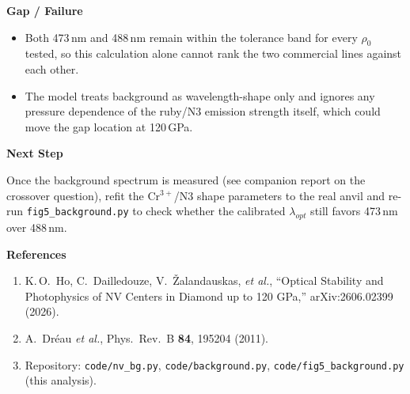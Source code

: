 \documentclass[11pt,a4paper]{ltjsarticle}
\newcommand{\sectionblock}[1]{%
  \vspace{2mm}
  {\large\textbf{#1}}
  \vspace{1mm}

}
\begin{document}
\sectionblock{Gap / Failure}

\begin{itemize}[leftmargin=8mm]
  \item Both 473\,nm and 488\,nm remain within the tolerance band for every $\rho_0$ tested, so this calculation alone cannot rank the two commercial lines against each other.
  \item The model treats background as wavelength-shape only and ignores any pressure dependence of the ruby/N3 emission strength itself, which could move the gap location at 120\,GPa.
\end{itemize}

\sectionblock{Next Step}

Once the background spectrum is measured (see companion report on the crossover question), refit the Cr$^{3+}$/N3 shape parameters to the real anvil and re-run \texttt{fig5\_background.py} to check whether the calibrated $\lambda_{opt}$ still favors 473\,nm over 488\,nm.

\sectionblock{References}

\begin{enumerate}[leftmargin=8mm]
  \item K.\,O.\ Ho, C.\ Dailledouze, V.\ \v{Z}alandauskas, \emph{et al.}, ``Optical Stability and Photophysics of NV Centers in Diamond up to 120 GPa,'' arXiv:2606.02399 (2026).
  \item A.\ Dr\'eau \emph{et al.}, Phys.\ Rev.\ B \textbf{84}, 195204 (2011).
  \item Repository: \texttt{code/nv\_bg.py}, \texttt{code/background.py}, \texttt{code/fig5\_background.py} (this analysis).
\end{enumerate}
\end{document}
